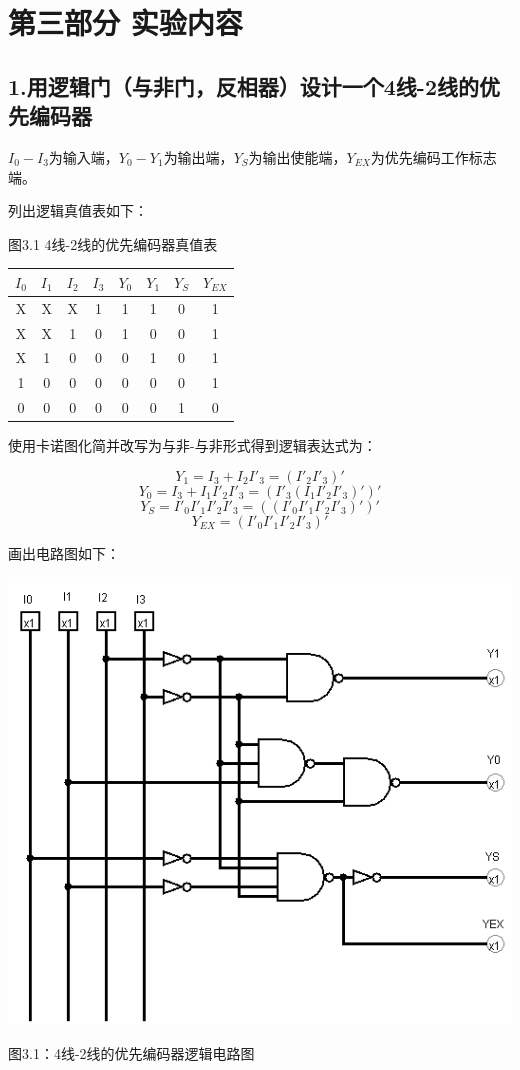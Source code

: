 \documentclass{ctexart}
\begin{document}
    \section*{第三部分 \quad 实验内容}
    \subsection*{1.用逻辑门（与非门，反相器）设计一个4线-2线的优先编码器}
    $I_0-I_3$为输入端，$Y_0-Y_1$为输出端，$Y_S$为输出使能端，$Y_{EX}$为优先编码工作标志端。

    列出逻辑真值表如下：

    \begin{table}[!ht]
    \centering 图3.1 4线-2线的优先编码器真值表
    
    \begin{tabular}{|cccc|cc|cc|}
    \hline
    $I_0$ & $I_1$ & $I_2$ & $I_3$ & $Y_0$ & $Y_1$ & $Y_S$ & $Y_{EX}$ \\ \hline
    X     & X     & X     & 1     & 1     & 1     & 0     & 1        \\ \hline
    X     & X     & 1     & 0     & 1     & 0     & 0     & 1        \\ \hline
    X     & 1     & 0     & 0     & 0     & 1     & 0     & 1        \\ \hline
    1     & 0     & 0     & 0     & 0     & 0     & 0     & 1        \\ \hline
    0     & 0     & 0     & 0     & 0     & 0     & 1     & 0        \\ \hline
    \end{tabular}
    \end{table}

    使用卡诺图化简并改写为与非-与非形式得到逻辑表达式为：

    $$Y_1=I_3+I_2I'_3=(I'_2I'_3)'$$
    $$Y_0=I_3+I_1I'_2I'_3=(I'_3(I_1I'_2I'_3)')'$$
    $$Y_S=I'_0I'_1I'_2I'_3=((I'_0I'_1I'_2I'_3)')'$$
    $$Y_{EX}=(I'_0I'_1I'_2I'_3)'$$

    画出电路图如下：

    \begin{minipage}[c]{\textwidth}
        \centering 
        \includegraphics[width=0.75\linewidth]{3.1.png} 
        
        图3.1：4线-2线的优先编码器逻辑电路图
    \end{minipage}
\end{document}
